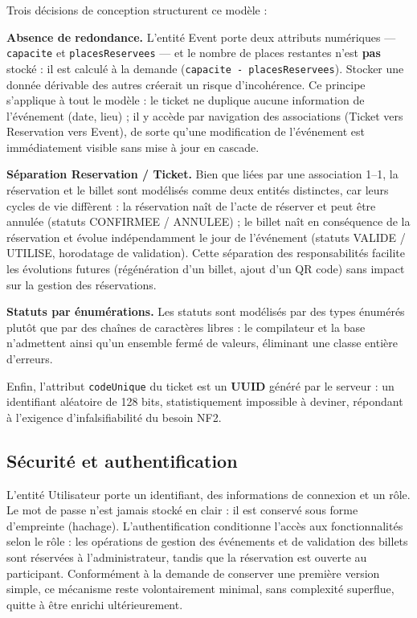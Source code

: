 \documentclass[12pt,a4paper]{report}
\newcommand{\code}[1]{\textcolor{codecolor}{\texttt{#1}}}
\begin{document}
Trois décisions de conception structurent ce modèle :

\textbf{Absence de redondance.} L'entité Event porte deux attributs numériques — \code{capacite} et \code{placesReservees} — et le nombre de places restantes n'est \textbf{pas} stocké : il est calculé à la demande (\code{capacite - placesReservees}). Stocker une donnée dérivable des autres créerait un risque d'incohérence. Ce principe s'applique à tout le modèle : le ticket ne duplique aucune information de l'événement (date, lieu) ; il y accède par navigation des associations (Ticket  vers  Reservation  vers  Event), de sorte qu'une modification de l'événement est immédiatement visible sans mise à jour en cascade.

\textbf{Séparation Reservation / Ticket.} Bien que liées par une association 1–1, la réservation et le billet sont modélisés comme deux entités distinctes, car leurs cycles de vie diffèrent : la réservation naît de l'acte de réserver et peut être annulée (statuts CONFIRMEE / ANNULEE) ; le billet naît en conséquence de la réservation et évolue indépendamment le jour de l'événement (statuts VALIDE / UTILISE, horodatage de validation). Cette séparation des responsabilités facilite les évolutions futures (régénération d'un billet, ajout d'un QR code) sans impact sur la gestion des réservations.

\textbf{Statuts par énumérations.} Les statuts sont modélisés par des types énumérés plutôt que par des chaînes de caractères libres : le compilateur et la base n'admettent ainsi qu'un ensemble fermé de valeurs, éliminant une classe entière d'erreurs.

Enfin, l'attribut \code{codeUnique} du ticket est un \textbf{UUID} généré par le serveur : un identifiant aléatoire de 128 bits, statistiquement impossible à deviner, répondant à l'exigence d'infalsifiabilité du besoin NF2.

\subsection{Sécurité et authentification}

L'entité Utilisateur porte un identifiant, des informations de connexion et un rôle. Le mot de passe n'est jamais stocké en clair : il est conservé sous forme d'empreinte (hachage). L'authentification conditionne l'accès aux fonctionnalités selon le rôle : les opérations de gestion des événements et de validation des billets sont réservées à l'administrateur, tandis que la réservation est ouverte au participant. Conformément à la demande de conserver une première version simple, ce mécanisme reste volontairement minimal, sans complexité superflue, quitte à être enrichi ultérieurement.
\end{document}
